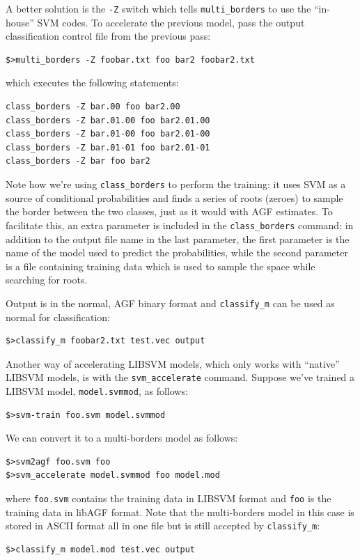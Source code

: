 \documentclass[12pt]{article}
\begin{document}
A better solution is the \verb/-Z/ switch which tells \verb/multi_borders/ 
to use the ``in-house'' SVM codes.
To accelerate the previous model, pass the output classification control file from the previous pass:
\begin{verbatim}
$>multi_borders -Z foobar.txt foo bar2 foobar2.txt
\end{verbatim}
which executes the following statements:
\begin{verbatim}
class_borders -Z bar.00 foo bar2.00
class_borders -Z bar.01.00 foo bar2.01.00
class_borders -Z bar.01-00 foo bar2.01-00
class_borders -Z bar.01-01 foo bar2.01-01
class_borders -Z bar foo bar2
\end{verbatim}

Note how we're using \verb/class_borders/ to perform the training: it uses SVM as a source of conditional probabilities and finds a series of roots (zeroes) to sample the border between the two classes, just as it would with AGF estimates.  
To facilitate this, an extra parameter is included in the \verb/class_borders/ command: in addition to the output file name in the last parameter, the first parameter is the name of the model used to predict the probabilities, 
while the second parameter is a file containing training data which is used to sample the space while searching for roots.  

Output is in the normal, AGF binary format and \verb/classify_m/ can be used as normal for classification:
\begin{verbatim}
$>classify_m foobar2.txt test.vec output
\end{verbatim}

Another way of accelerating LIBSVM models, which only works with ``native''
LIBSVM models, is with the \verb/svm_accelerate/ command.
Suppose we've trained a LIBSVM model, \verb/model.svmmod/, as follows:
\begin{verbatim}
$>svm-train foo.svm model.svmmod
\end{verbatim}
We can convert it to a multi-borders model as follows:
\begin{verbatim}
$>svm2agf foo.svm foo
$>svm_accelerate model.svmmod foo model.mod
\end{verbatim}
where \verb/foo.svm/ contains the training data in LIBSVM format and \verb/foo/
is the training data in libAGF format. Note that the multi-borders model
in this case is stored in ASCII format all in one file but is still 
accepted by \verb/classify_m/:
\begin{verbatim}
$>classify_m model.mod test.vec output
\end{verbatim}
\end{document}
